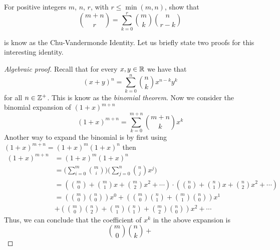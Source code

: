 \documentclass[a4paper, english, 12pt]{article} %
\begin{document}
\begin{problem}[4]
  \begin{subproblem}
    \label{subproblem:4a}
    For positive integers $m$, $n$, $r$, with $r \leq \min(m, n)$, show that
    \begin{equation}
      \label{eq:Chu-Vandermonde-Identity}
      \binom{m + n}{r} = \sum_{k = 0}^r \binom{m}{k} \binom{n}{r - k}
    \end{equation}
  \end{subproblem}
\end{problem}

\begin{answer}
   is know as the Chu-Vandermonde Identity.
  Let us briefly state two proofs for this interesting identity.
  \begin{proof}[Algebraic proof]
    Recall that for every $x,y \in \mathbb{R}$ we have that
    \begin{equation}
      (x + y)^n = \sum_{k = 0}^n \binom{n}{k} x^{n-k}y^k
    \end{equation}
    for all $n \in \mathbb{Z}^+$. This is know as the \emph{binomial theorem}. Now
    we consider the binomial expansion of $(1+x)^{m+n}$
    \begin{equation*}
      (1 + x)^{m + n} = \sum_{k = 0}^{m + n} \binom{m + n}{k} x^k
    \end{equation*}
    Another way to expand the binomial is by first using
    $(1+x)^{m+n} = (1+x)^m (1+x)^n$ then
    \begin{align*}
      (1+x)^{m+n}
      & = (1+x)^m (1+x)^n \\
      & = \biggl( \sum_{i=0}^m \binom{m}{i}  \biggr)
      \biggl( \sum_{j=0}^n \binom{n}{j} x^j \biggr) \\
      & = \left( \binom{m}{0} + \binom{m}{1}x + \binom{m}{2}x^2 + \cdots \right)
        \cdot \left( \binom{n}{0} + \binom{n}{1}x + \binom{n}{2}x^2 + \cdots \right) \\
      & = \left( \binom{m}{0}\binom{n}{0} \right) x^0
        + \left( \binom{m}{0}\binom{n}{1} + \binom{m}{1}\binom{n}{0} \right)x^1 \\
      & + \left( \binom{m}{0}\binom{n}{2} + \binom{m}{1}\binom{n}{1} + \binom{m}{2}\binom{n}{0} \right)x^2 + \cdots
    \end{align*}
    Thus, we can conclude that the coefficient of $x^k$ in the above expansion
    is
    \begin{equation*}
      \binom{m}{0}\binom{n}{k} +

\end{equation*}
\end{proof}
\end{answer}
\end{document}
